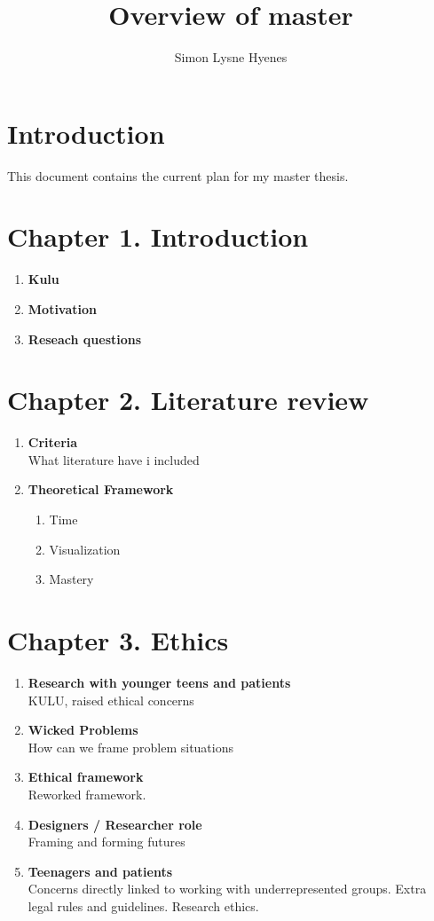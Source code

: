 \documentclass[11pt,UKenglish, a4paper]{article}
\author{Simon Lysne Hyenes}
\title{Overview of master}
\begin{document}
\maketitle{}
\section{Introduction}
This document contains the current plan for my master thesis.

\section{Chapter 1. Introduction}
\begin{enumerate}
\item \textbf{Kulu}
\item \textbf{Motivation}
\item \textbf{Reseach questions}
\end{enumerate}

\section{Chapter 2. Literature review}
\begin{enumerate}[label=\bfseries\arabic*]
\item \textbf{Criteria}\hfill \\
What literature have i included

\item \textbf{Theoretical Framework}
	\begin{enumerate}[label=\bfseries\arabic*]
	\item Time
	\item Visualization
	\item Mastery
	\end{enumerate}
\end{enumerate}

\section{Chapter 3. Ethics}
\begin{enumerate}[label=\bfseries\arabic*]
\item \textbf{Research with younger teens and patients} \hfill \\
KULU, raised ethical concerns
\item \textbf{Wicked Problems} \hfill \\
How can we frame problem situations
\item \textbf{Ethical framework} \hfill \\
Reworked framework. 
\item \textbf{Designers / Researcher role} \hfill \\
Framing and forming futures
\item \textbf{Teenagers and patients} \hfill \\
Concerns directly linked to working with underrepresented groups. Extra legal rules and guidelines. Research ethics. 
\end{enumerate}
\end{document}
